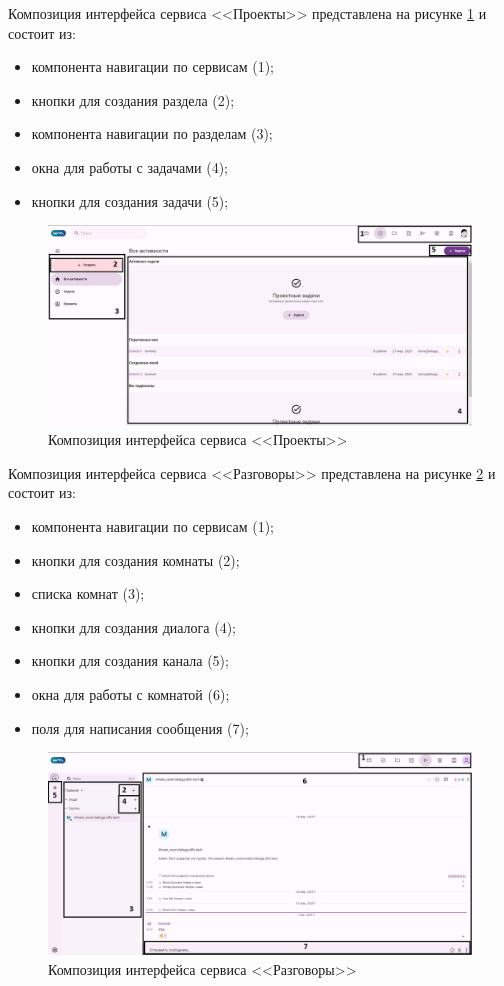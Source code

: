 Композиция интерфейса сервиса <<Проекты>> представлена на рисунке \ref{templ:image7} и состоит из:
\begin{itemize}
  \item компонента навигации по сервисам (1);
  \item кнопки для создания раздела (2);
  \item компонента навигации по разделам (3);
  \item окна для работы с задачами (4);
  \item кнопки для создания задачи (5);
\end{itemize}
\begin{figure}[H]
	\centering
	\includegraphics[width=1\linewidth]{images/проекты}
	\caption{Композиция интерфейса сервиса <<Проекты>>}
	\label{templ:image7}
\end{figure}

Композиция интерфейса сервиса <<Разговоры>> представлена на рисунке \ref{templ:image8} и состоит из:
\begin{itemize}
  \item компонента навигации по сервисам (1);
  \item кнопки для создания комнаты (2);
  \item списка комнат (3);
  \item кнопки для создания диалога (4);
  \item кнопки для создания канала (5);
  \item окна для работы с комнатой (6);
  \item поля для написания сообщения (7);
\end{itemize}
\begin{figure}[H]
	\centering
	\includegraphics[width=1\linewidth]{images/разговоры}
	\caption{Композиция интерфейса сервиса <<Разговоры>>}
	\label{templ:image8}
\end{figure}

